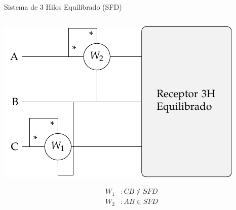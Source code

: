 \documentclass[aspectratio=169, usenames,svgnames,dvipsnames]{beamer}
\begin{document}
\begin{frame}[label={sec:org3bd21b7},plain]{Sistema de 3 Hilos Equilibrado (SFD)}
\begin{columns}
\begin{column}{0.33\columnwidth}
\begin{center}
\includegraphics[width=.9\linewidth]{../figs/Potencia3H_Equilibrado_CA.pdf}
\end{center}
\begin{align*}
  W_1&: CB \notin SFD\\
  W_2&: AB \in SFD\\
\end{align*}
\end{column}
\end{columns}
\end{frame}
\end{document}
